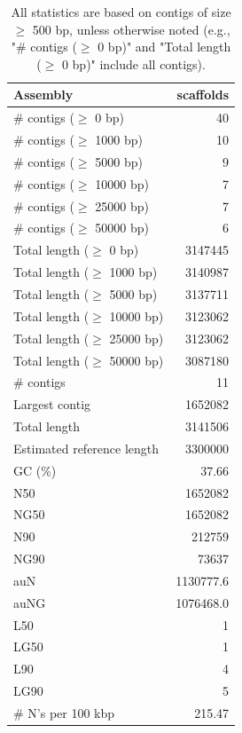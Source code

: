 \documentclass[12pt,a4paper]{article}
\begin{document}
\begin{table}[ht]
\begin{center}
\caption{All statistics are based on contigs of size $\geq$ 500 bp, unless otherwise noted (e.g., "\# contigs ($\geq$ 0 bp)" and "Total length ($\geq$ 0 bp)" include all contigs).}
\begin{tabular}{|l*{1}{|r}|}
\hline
Assembly & scaffolds \\ \hline
\# contigs ($\geq$ 0 bp) & 40 \\ \hline
\# contigs ($\geq$ 1000 bp) & 10 \\ \hline
\# contigs ($\geq$ 5000 bp) & 9 \\ \hline
\# contigs ($\geq$ 10000 bp) & 7 \\ \hline
\# contigs ($\geq$ 25000 bp) & 7 \\ \hline
\# contigs ($\geq$ 50000 bp) & 6 \\ \hline
Total length ($\geq$ 0 bp) & 3147445 \\ \hline
Total length ($\geq$ 1000 bp) & 3140987 \\ \hline
Total length ($\geq$ 5000 bp) & 3137711 \\ \hline
Total length ($\geq$ 10000 bp) & 3123062 \\ \hline
Total length ($\geq$ 25000 bp) & 3123062 \\ \hline
Total length ($\geq$ 50000 bp) & 3087180 \\ \hline
\# contigs & 11 \\ \hline
Largest contig & 1652082 \\ \hline
Total length & 3141506 \\ \hline
Estimated reference length & 3300000 \\ \hline
GC (\%) & 37.66 \\ \hline
N50 & 1652082 \\ \hline
NG50 & 1652082 \\ \hline
N90 & 212759 \\ \hline
NG90 & 73637 \\ \hline
auN & 1130777.6 \\ \hline
auNG & 1076468.0 \\ \hline
L50 & 1 \\ \hline
LG50 & 1 \\ \hline
L90 & 4 \\ \hline
LG90 & 5 \\ \hline
\# N's per 100 kbp & 215.47 \\ \hline
\end{tabular}
\end{center}
\end{table}
\end{document}
